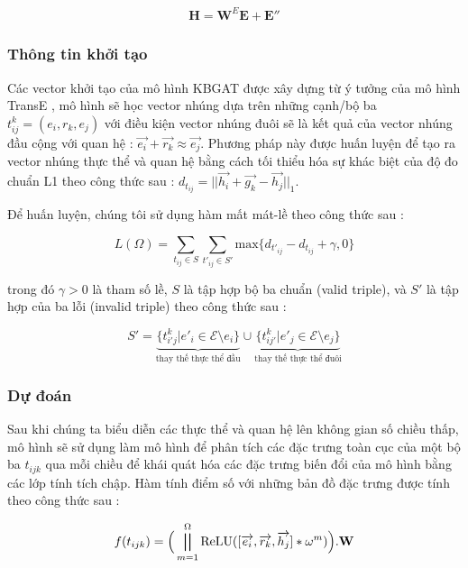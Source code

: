 \begin{align}
\mathbf{H} = \mathbf{W}^E \mathbf{E} + \mathbf{E''}
\end{align}

\subsubsection{Thông tin khởi tạo}
\label{sec:KBGATTraning}

Các vector khởi tạo của mô hình KBGAT được xây dựng từ ý tưởng của mô hình TransE \cite{bordes2013translating}, mô hình sẽ học vector nhúng dựa trên những cạnh/bộ ba $t^k_{ij} = (e_i, r_k, e_j)$ với điều kiện vector nhúng đuôi sẽ là kết quả của vector nhúng đầu cộng với quan hệ : $\vec{e_i}+\vec{r_k} \approx \vec{e_j}$. Phương pháp này được huấn luyện để tạo ra vector nhúng thực thể và quan hệ bằng cách tối thiểu hóa sự khác biệt của độ đo chuẩn L1 theo công thức sau :
$d_{t_{ij}} = \big|\big|\vec{h_i}+ \vec{g_k}-\vec{h_j}\big|\big|_1$.

Để huấn luyện, chúng tôi sử dụng hàm mất mát-lề theo công thức sau :

\begin{equation}
L(\Omega)=\sum_{t_{ij} \in S} \sum_{t'_{ij} \in S'} \text{max}\{d_{t'_{ij}} - d_{t_{ij}} + \gamma , 0 \}
\end{equation}

trong đó $\gamma > 0$ là tham số lề, $S$ là tập hợp bộ ba chuẩn (valid triple), và $S'$ là tập hợp của ba lỗi (invalid triple) theo công thức sau :

\begin{equation}
{S'} ={\underbrace{\{ t^k_{i'j} | e'_i \in \mathcal{E}\setminus e_i\}}_{\text{thay thế thực thể đầu}}\cup \underbrace{\{ t^k_{ij'} | e'_j \in \mathcal{E}\setminus e_j\}}_{\text{thay thế thực thể đuôi}}}
\end{equation}

\subsubsection{Dự đoán}

Sau khi chúng ta biểu diễn các thực thể và quan hệ lên không gian số chiều thấp, mô hình sẽ sử dụng \cite{nguyen2017novel} làm mô hình để phân tích các đặc trưng toàn cục của một bộ ba $t_{ijk}$ qua mỗi chiều để khái quát hóa các đặc trưng biến đổi của mô hình bằng các lớp tính tích chập. Hàm tính điểm số với những bản đồ đặc trưng được tính theo công thức sau :

\begin{equation}
f(t_{i j k}) = \Big( \bigparallel_{m=1}^{\Omega} \text{ReLU} ([\overrightarrow{e_i}, \overrightarrow{r_k}, \overrightarrow{h_j}] \ast \omega^m)\Big).\mathbf{W}
\end{equation}


